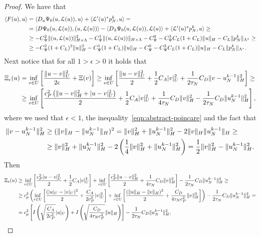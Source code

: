 \documentclass[a4paper,10pt,oneside]{amsbook}
\numberwithin{section}{chapter}
\numberwithin{equation}{chapter}
\theoremstyle{definition}
\DeclarePairedDelimiter{\norm}{\lVert}{\rVert}
\DeclarePairedDelimiter{\dual}{\langle}{\rangle}
\begin{document}
\begin{proof}
We have that
\[
\begin{split}
\dual{F(u),u}&=\dual{D_u\Psi_0(u,\mathcal{L}(u)),u}+\dual{\mathcal{L}'(u)^*p_N^k,u}=\\
&=\dual{D\Psi_0(u,\mathcal{L}(u)),(u,\mathcal{L}(u))}-\dual{D_\lambda\Psi_0(u,\mathcal{L}(u)),\mathcal{L}(u)}+\dual{\mathcal{L}'(u)^*p_N^k,u}\ge\\
&\ge-C_\Psi^2\norm{(u,\mathcal{L}(u))}_{H\times\Lambda}^2-C_\Psi^1\norm{(u,\mathcal{L}(u))}_{H\times\Lambda}-C_\Psi^0-C_\Psi^3C_L(1+C_L)\norm{u}_H-C_L\norm{p_N^k}_{\Lambda^*}\ge\\
&\ge-C_\Psi^2(1+C_L)^2\norm{u}_H^2-C_\Psi^1(1+C_L)\norm{u}_H-C_\Psi^0-C_\Psi^3C_L(1+C_L)\norm{u}_H-C_L\norm{p_N^k}_{\Lambda^*}.
\end{split}
\]
Next notice that for all $1>\epsilon>0$ it holds that
\[
\begin{split}
\Xi_\epsilon(u)&=\inf_{v\in U}\left[\frac{\norm{u-v}_U^2}{2\epsilon}+\Xi(v)\right]\ge\inf_{v\in U}\left[\frac{\norm{u-v}_U^2}{2}+\frac{1}{2}C_A|v|_U^2+\frac{1}{2\tau_N}C_D\norm{v-u_N^{k-1}}_H^2\right]\ge\\
&\ge\inf_{v\in U}\left[\frac{c_P^2\left(\norm{u-v}_H^2+|u-v|_U^2\right)}{2}+\frac{1}{2}C_A|v|_U^2+\frac{1}{4\tau_N}C_D\norm{v}^2_H-\frac{1}{2\tau_N}C_D\norm{u_N^{k-1}}_H^2\right],
\end{split}
\]
where we used that $\epsilon<1$, the inequality~\eqref{eqn:abstract-poincare} and the fact that
\[
\begin{split}
\norm{v-u_N^{k-1}}_H^2&\ge(\norm{v}_H-\norm{u_N^{k-1}}_H)^2=\norm{v}_H^2+\norm{u_N^{k-1}}_H^2-2\norm{v}_H\norm{u_N^{k-1}}_H\ge\\
&\ge\norm{v}_H^2+\norm{u_N^{k-1}}_H^2-2\left(\frac{1}{4}\norm{v}_H^2+\norm{u_N^{k-1}}_H^2\right)=\frac{1}{2}\norm{v}_H^2-\norm{u_N^{k-1}}_H^2.
\end{split}
\]
Then
\[
\begin{split}
\Xi_\epsilon(u)&\ge\inf_{v\in U}\left[\frac{c_P^2|u-v|_U^2}{2}+\frac{1}{2}C_A|v|_U^2\right]+\inf_{v\in U}\left[\frac{c_P^2\norm{u-v}_H^2}{2}+\frac{1}{4\tau_N}C_D\norm{v}_H^2\right]-\frac{1}{2\tau_N}C_D\norm{u_N^{k-1}}_H^2\ge\\
&\ge c_p^2\left(\inf_{v\in U}\left[\frac{(|u|_U-|v|_U)^2}{2}+\frac{C_A}{2c_P^2}|v|_U^2\right]+\inf_{v\in U}\left[\frac{(\norm{u}_H-\norm{v}_H)^2}{2}+\frac{C_D}{4\tau_Nc_P^2}\norm{v}_H^2\right]\right)-\frac{1}{2\tau_N}C_D\norm{u_N^{k-1}}_H^2=\\
&=c_p^2\left[I\left(\sqrt{\frac{C_A}{2c_P^2}}|u|_U\right)+I\left(\sqrt{\frac{C_D}{4\tau_Nc_P^2}}\norm{u}_H\right)\right]-\frac{1}{2\tau_N}C_D\norm{u_N^{k-1}}_H^2,

\end{split}\]
\end{proof}
\end{document}

